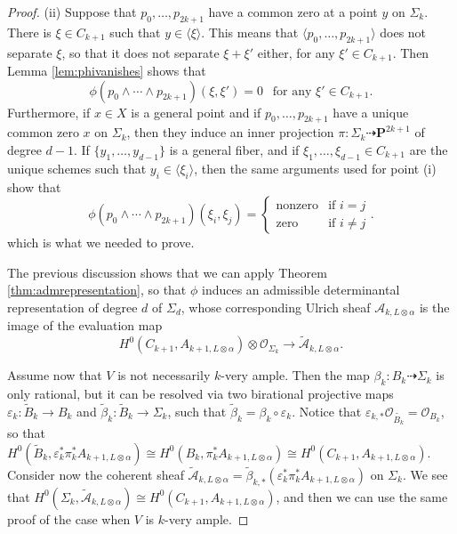 \documentclass[10pt,a4paper]{amsart}
\newcommand{\nP}{\mathbf{P}}
\newcommand{\sA}{\mathscr{A}}
\newcommand{\sO}{\mathscr{O}}
\begin{document}
\begin{proof}
	\noindent
	(ii) Suppose that $p_0, \ldots, p_{2k+1}$ have a common zero at a point $y$ on $\Sigma_k$. There is $\xi \in C_{k+1}$ such that $y\in \langle \xi \rangle$. This means that $\langle p_0,\dots,p_{2k+1} \rangle$ does not separate $\xi$, so that it does not separate $\xi+\xi'$ either, for any  $\xi'\in C_{k+1}$. Then Lemma \ref{lem:phivanishes} shows that
	$$
	\phi(p_0 \wedge \cdots \wedge p_{2k+1})(\xi, \xi')=0~~\text{ for any $\xi' \in C_{k+1}$}.
	$$
	Furthermore, if $x\in X$ is a general point and if $p_0,\dots,p_{2k+1}$ have a unique common zero $x$ on $\Sigma_k$, then they induce an inner projection $\pi\colon \Sigma_k \dashrightarrow \nP^{2k+1}$ of degree $d-1$. If $\{y_1,\dots,y_{d-1}\}$ is a general fiber, and if $\xi_1,\dots,\xi_{d-1} \in C_{k+1}$ are the unique schemes such that $y_i \in \langle \xi_i \rangle$, then the same arguments used for point (i) show that
	$$
	\phi(p_0 \wedge \cdots \wedge p_{2k+1})(\xi_i, \xi_j) =
	\begin{cases} \text{nonzero} & \text{if $i=j$} \\ \text{zero} & \text{if $i \neq j$} \end{cases}.
	$$
	which is what we needed to prove.
	\medskip

	\noindent
	The previous discussion shows that we can apply Theorem \ref{thm:admrepresentation}, so that $\phi$ induces an admissible determinantal representation of degree $d$ of $\Sigma_d$, whose corresponding Ulrich sheaf $\sA_{k,L\otimes \alpha}$ is the image of the evaluation map
	\[  H^0(C_{k+1},A_{k+1,L\otimes \alpha}) \otimes \sO_{\Sigma_k} \longrightarrow \widetilde{\sA}_{k,L\otimes \alpha}. \]
	\medskip

	\noindent
	Assume now that $V$ is not necessarily $k$-very ample. Then the map $\beta_k\colon B_k \dashrightarrow \Sigma_k$ is only rational, but it can be resolved via two birational projective maps $\varepsilon_k \colon \widetilde{B}_k \to B_k$ and $\widetilde{\beta}_k\colon \widetilde{B}_k \to \Sigma_k$, such that $\widetilde{\beta}_k = \beta_k \circ \varepsilon_k$. Notice that  $\varepsilon_{k,*}\sO_{\widetilde{B_k}} = \sO_{B_k}$, so that  $H^0(\widetilde{B}_k,\varepsilon_k^*\pi_k^*A_{k+1,L\otimes \alpha}) \cong H^0(B_k,\pi_k^*A_{k+1,L\otimes \alpha}) \cong H^0(C_{k+1},A_{k+1,L\otimes \alpha})$. Consider now the coherent sheaf $\widetilde{\sA}_{k,L\otimes \alpha} = \widetilde{\beta}_{k,*}(\varepsilon_k^* \pi_k^* A_{k+1,L\otimes \alpha})$ on $\Sigma_k$. We see that $H^0(\Sigma_k,\widetilde{\sA}_{k,L\otimes \alpha}) \cong H^0(C_{k+1},A_{k+1,L\otimes \alpha})$, and then we can use the same proof of the case when $V$ is $k$-very ample.
	\medskip



\end{proof}
\end{document}
